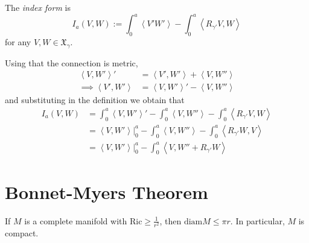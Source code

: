 \begin{definition}
\label{definition-index-form}
The {\it index form} is
\begin{equation}
\label{equation-index-form}
I_a(V,W):=\int_0^a
\left<V'W'\right>-\int_0^a\left<R_{\gamma'}V,W\right>
\end{equation}
for any $V,W \in \mathfrak{X}_\gamma$.
\end{definition}

\begin{remark}
\label{remark-index-form-alternative-formula}
Using that the connection is metric,
\begin{align*}
\left<V,W'\right>'&=\left<V',W'\right>+\left<V,W''\right>\\
\implies  \left<V',W'\right>&=\left<V,W'\right>'- \left<V,W''\right>
\end{align*}
and substituting in the definition we obtain that
\begin{equation}
\label{equation-index-form-alternative-formula}
\begin{aligned}
I_a(V,W)&=\int_0^a\left<V,W'\right>'-\int_0^a \left<V,W''\right>-\int_0^a \left<R_{\gamma'}V,W\right>\\
&=\left<V,W'\right>|_{0}^a-\int_0^a \left<V,W''\right>-\int_0^a\left<R_{\gamma'}W,V\right>\\
&=\left<V,W'\right>|_{0}^a-\int_0^a \left<V,W''+R_{\gamma'}W\right>
\end{aligned}
\end{equation}
\end{remark}

\section{Bonnet-Myers Theorem}
\label{subsection-Bonnet-Myers-theorem}

\begin{theorem}
\label{theorem-Bonnet-Myers}
If $M$ is a complete manifold with $\text{Ric} \geq \frac{1}{r^2}$, then
$\text{diam}M\leq \pi r$. In particular, $M$ is compact.
\end{theorem}

